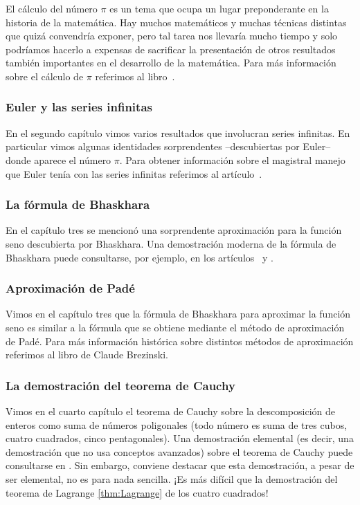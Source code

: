 El cálculo del número $\pi$ es un tema que ocupa un lugar preponderante en la
historia de la matemática. Hay muchos matemáticos y muchas técnicas distintas
que quizá convendría exponer, pero tal tarea nos llevaría mucho tiempo y solo
podríamos hacerlo a expensas de sacrificar la presentación de otros resultados
también importantes en el desarrollo de la matemática. Para más información
sobre el cálculo de $\pi$ referimos al libro~\cite{MR0449960}. 

\subsubsection*{Euler y las series infinitas}

En el segundo capítulo vimos varios resultados que involucran series infinitas. En particular 
vimos algunas identidades sorprendentes --descubiertas por Euler-- 
donde aparece el número $\pi$. Para obtener información 
sobre el magistral manejo que Euler tenía con las series
infinitas referimos al artículo~\cite{MR2338363}.

\subsubsection*{La fórmula de Bhaskhara}

En el capítulo tres se mencionó una sorprendente aproximación 
para la función seno descubierta por Bhaskhara. 
Una demostración moderna de la fórmula de Bhaskhara puede
consultarse, por ejemplo, en los artículos~\cite{MR1108101} y \cite{MR2793182}.

\subsubsection*{Aproximación de Pad\'e}

Vimos en el capítulo tres que la fórmula de Bhaskhara 
para aproximar la función seno es similar a la fórmula que
se obtiene mediante el método de aproximación de Pad\'e. Para
más información histórica sobre distintos m\'etodos 
de aproximación referimos al libro \cite{MR1083352} 
de Claude Brezinski. 

\subsubsection*{La demostración del teorema de Cauchy}

Vimos en el cuarto capítulo el teorema de Cauchy 
sobre la descomposición de enteros como suma de números poligonales (todo número
es suma de tres cubos, cuatro cuadrados, cinco pentagonales). Una demostración
elemental (es decir, una demostración que no usa conceptos avanzados) 
sobre el teorema de Cauchy puede consultarse en \cite{MR866422}. Sin embargo,
conviene destacar que esta demostración, a pesar de ser elemental, no es
para nada sencilla. ¡Es más difícil que la demostración 
del teorema de Lagrange \ref{thm:Lagrange} de los cuatro cuadrados!

